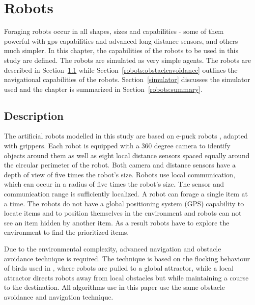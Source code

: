 
\chapter{Robots}
\label{chap:robots}

Foraging robots occur in all shapes, sizes and capabilities - some of them powerful with gps capabilities and advanced long distance sensors, and others much simpler. In this chapter, the capabilities of the robots to be used in this study are defined. The robots are simulated as very simple agents. The robots are described in Section~\ref{robotdescription} while Section~\ref{robots:obstacleavoidance} outlines the navigational capabilities of the robots. Section~\ref{simulator} discusses the simulator used and the chapter is summarized in Section~\ref{robots:summary}.

\section{Description}
\label{robotdescription}

The artificial robots modelled in this study are based on e-puck robots \cite{mondada2009puck}, adapted with grippers. Each robot is equipped with a 360 degree camera to identify objects around them as well as eight local distance sensors spaced equally around the circular perimeter of the robot. Both camera and distance sensors have a depth of view of five times the robot's size. Robots use local communication, which can occur in a radius of five times the robot's size. The sensor and communication range is sufficiently localized. A robot can forage a single item at a time. The robots do not have a global positioning system (GPS) capability to locate items and to position themselves in the environment and robots can not see an item hidden by another item. As a result robots have to explore the environment to find the prioritized items.

Due to the environmental complexity, advanced navigation and obstacle avoidance technique is required. The technique is based on the flocking behaviour of birds used in \cite{antoniou2012congestion}, where robots are pulled to a global attractor, while a local attractor directs robots away from local obstacles but while maintaining a course to the destination. All algorithms use in this paper use the same obstacle avoidance and navigation technique. 

